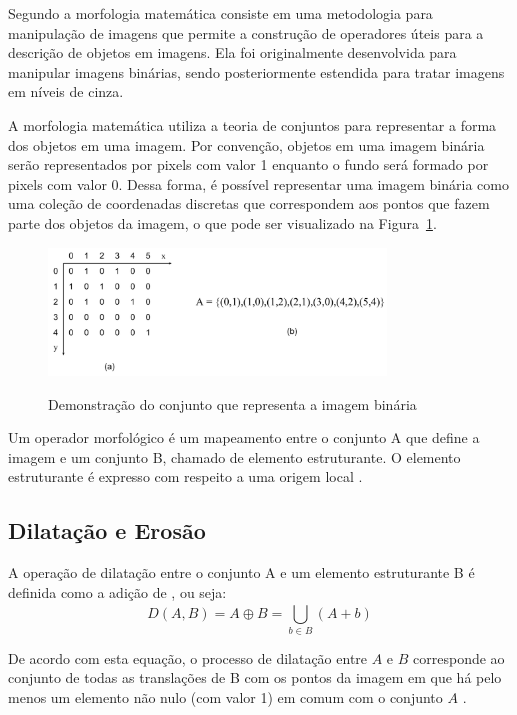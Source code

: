 \documentclass[12pt,oneside,a4paper,english,french,spanish,brazil,]{abntex2}
\begin{document}
Segundo \citet{pedrini:2008} a morfologia matemática consiste em uma metodologia para manipulação de imagens que permite a construção de operadores úteis para a descrição de objetos em imagens. Ela foi originalmente desenvolvida para manipular imagens binárias, sendo posteriormente estendida para tratar imagens em níveis de cinza.

A morfologia matemática utiliza a teoria de conjuntos para representar a forma dos objetos em uma imagem. Por convenção, objetos em uma imagem binária serão representados por pixels com valor 1 enquanto o fundo será formado por pixels com valor 0. Dessa forma, é possível representar uma imagem binária como uma coleção de coordenadas discretas que correspondem aos pontos que fazem parte dos objetos da imagem, o que pode ser visualizado na Figura~\ref{fig:PDI_Conjunto}.

\begin{figure}[ht]
\centering
\caption{Demonstração do conjunto que representa a imagem binária}
\includegraphics[width=0.8\textwidth]{imagens/PDI_Conjunto.pdf}
\label{fig:PDI_Conjunto}
\end{figure}

Um operador morfológico é um mapeamento entre o conjunto A que define a imagem e um conjunto B, chamado de elemento estruturante. O elemento estruturante é expresso com respeito a uma origem local \cite{pedrini:2008}.

\subsection{Dilatação e Erosão}

A operação de dilatação entre o conjunto A e um elemento estruturante B é definida como a adição de \citet{minkowski:1911}, ou seja: \[D(A,B)=A\oplus B=\bigcup_{b\in B}^{ } (A+b)\]

De acordo com esta equação, o processo de dilatação entre \(A\) e \(B\) corresponde ao conjunto de todas as translações de B com os pontos da imagem em que há pelo menos um elemento não nulo (com valor 1) em comum com o conjunto \(A\) \cite{pedrini:2008}. 
\end{document}
